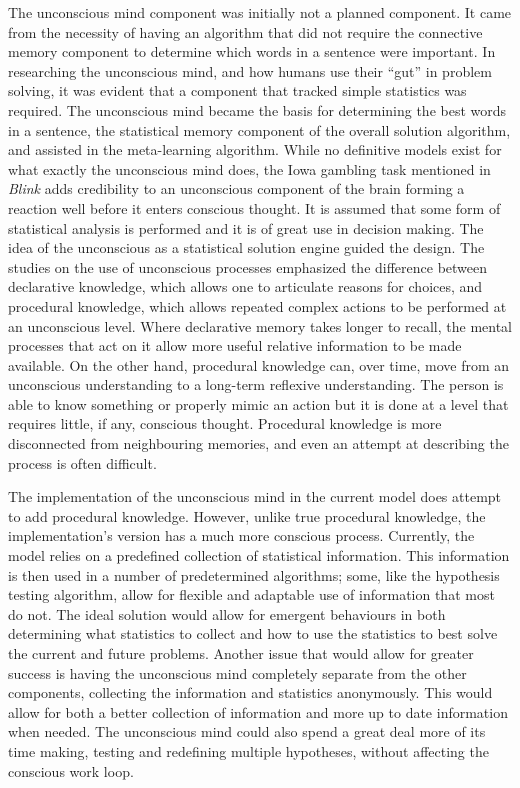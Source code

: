 The unconscious mind component was initially not a planned component.  It came
from the necessity of having an algorithm that did not require the connective
memory component to determine which words in a sentence were important. In
researching the unconscious mind, and how humans use their ``gut'' in problem
solving, it was evident that a component that tracked simple statistics was
required. The unconscious mind became the basis for determining the best words
in a sentence, the statistical memory component of the overall solution
algorithm, and assisted in the meta-learning algorithm.  While no definitive
models exist for what exactly the unconscious mind does, the Iowa gambling task
\cite{Bechara1, Bechara2} mentioned in {\it Blink} \cite{BLINK} adds credibility to an
unconscious component of the brain forming a reaction well before it enters
conscious thought. It is assumed that some form of statistical analysis is
performed and it is of great use in decision making.  The idea of the
unconscious as a statistical solution engine guided the design.  The studies on
the use of unconscious processes emphasized the difference between declarative
knowledge, which allows one to articulate reasons for choices, and procedural
knowledge, which allows repeated complex actions to be performed at an
unconscious level.  Where declarative memory takes longer to recall, the mental
processes that act on it allow more useful relative information to be made
available.  On the other hand, procedural knowledge can, over time, move from an 
unconscious understanding to a long-term reflexive understanding.  The person
is able to know something or properly mimic an action but it is done at a level
that requires little, if any, conscious thought.  Procedural knowledge is more
disconnected from neighbouring memories, and even an attempt at describing the
process is often difficult.

The implementation of the unconscious mind in the current model does attempt to
add procedural knowledge.  However, unlike true procedural knowledge, the
implementation's version has a much more conscious process.  Currently, the model
relies on a predefined collection of statistical information.  This information is
then used in a number of predetermined algorithms; some, like the hypothesis
testing algorithm, allow for flexible and adaptable use of information that most do
not.  The ideal solution would allow for emergent behaviours in both determining
what statistics to collect and how to use the statistics to best solve the
current and future problems.  Another issue that would allow for greater success
is having the unconscious mind completely separate from the other components,
collecting the information and statistics anonymously. This would allow for both
a better collection of information and more up to date information when needed.
The unconscious mind could also spend a great deal more of its time making,
testing and redefining multiple hypotheses, without affecting the conscious work
loop.

